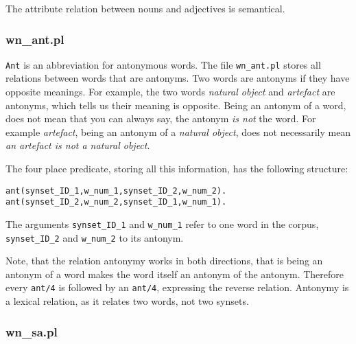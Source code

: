 \documentclass[12pt]{article}
\begin{document}
The attribute relation between nouns and adjectives is semantical.

\subsubsection{wn\_ant.pl}

{\tt Ant} is an abbreviation for antonymous words. The file {\tt wn\_ant.pl} stores all relations between words that are antonyms.
Two words are antonyms if they have opposite meanings.
For example, the two words \emph{natural object} and \emph{artefact} are antonyms, which tells us their meaning is opposite.
Being an antonym of a word, does not mean that you can always say, the antonym \emph{is not} the word.
For example \emph{artefact}, being an
antonym of a \emph{natural object}, does not necessarily mean \emph{an artefact is not a natural object}.

The four place predicate, storing all this information, has the following structure:
\begin{verbatim}
ant(synset_ID_1,w_num_1,synset_ID_2,w_num_2).
ant(synset_ID_2,w_num_2,synset_ID_1,w_num_1).
\end{verbatim}
The arguments {\tt synset\_ID\_1} and {\tt w\_num\_1} refer to one word in the corpus,
{\tt synset\_ID\_2} and {\tt w\_num\_2} to its antonym.

Note, that the relation antonymy works in both directions, that is being an antonym of a word makes
the word itself an antonym of the antonym. Therefore every {\tt ant/4} is followed by an {\tt ant/4},
expressing the reverse relation. Antonymy is a lexical relation, as it relates two words, not two synsets.

\subsubsection{wn\_sa.pl}
\end{document}
